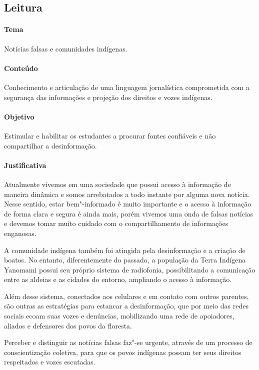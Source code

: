 \documentclass[12pt]{extarticle}
\begin{document}
{\subsection{Leitura}


\paragraph{Tema} Notícias falsas e comunidades indígenas.

\paragraph{Conteúdo} Conhecimento e articulação de uma linguagem jornalística
comprometida com a segurança das informações e projeção dos direitos e vozes
indígenas. 

\paragraph{Objetivo} Estimular e habilitar os estudantes a procurar fontes
confiáveis e não compartilhar a desinformação.

\paragraph{Justificativa} Atualmente vivemos em uma sociedade que possui acesso 
à informação de maneira dinâmica e somos arrebatados a todo instante por alguma 
nova notícia. Nesse sentido, estar bem"-informado é muito importante e o acesso à
informação de forma clara e segura é ainda mais, porém vivemos uma onda de falsas 
notícias e devemos tomar muito cuidado com o compartilhamento de informações enganosas.

A comunidade indígena também foi atingida pela desinformação e a criação de boatos.
No entanto, diferentemente do passado, a população da Terra Indígena Yanomami possui seu
próprio sistema de radiofonia, possibilitando a comunicação entre as aldeias e as cidades 
do entorno, ampliando o acesso à informação.

Além desse sistema, conectados aos celulares e em contato com outros parentes, são outras as
estratégias para estancar a desinformação, que por meio das redes sociais ecoam suas vozes e 
denúncias, mobilizando uma rede de apoiadores, aliados e defensores dos povos da floresta. 

Perceber e distinguir as notícias falsas faz"-se urgente, através de um processo de conscientização
coletiva, para que os povos indígenas possam ter seus direitos respeitados e vozes escutadas. 

}
\end{document}
